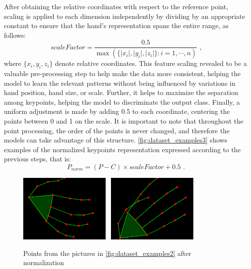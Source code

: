 After obtaining the relative coordinates with respect to the reference point, scaling is applied to each dimension independently by dividing by an appropriate constant to ensure that the hand’s representation spans the entire range, as follows:
\begin{equation}
scaleFactor = \frac {0.5}{\max(\{\lvert x_i \rvert,\lvert y_i \rvert,\lvert z_i\rvert\}: i=1,\cdots,n)} \text{  ,}
\end{equation}
%
where $\{x_i,y_i,z_i\}$ denote relative coordinates. This feature scaling revealed to be a valuable pre-processing step to help make the data more consistent, helping the model to learn the relevant patterns without being influenced by variations in hand position, hand size, or scale. Further, it helps to maximize the separation among keypoints, helping the model to discriminate the output class. Finally, a uniform adjustment is made by adding 0.5 to each coordinate, centering the points between 0 and 1 on the scale. It is important to note that throughout the point processing, the order of the points is never changed, and therefore the models can take advantage of this structure. \autoref{fig:dataset_examples3} shows examples of the normalized keypoints representation expressed according to the previous steps, that is:
\begin{equation}
P_{norm} = (P - C) \times scaleFactor + 0.5\text{ .}
\end{equation}

\begin{figure}[ht]
    \centerline{\includegraphics[width=0.4\textwidth]{figs/dataset_preprocessing3_1.png} \ \includegraphics[width=0.4\textwidth]{figs/dataset_preprocessing3_2.png}}
    \caption{Points from the pictures in \autoref{fig:dataset_examples2} after normalization}
    \label{fig:dataset_examples3}
\end{figure}

